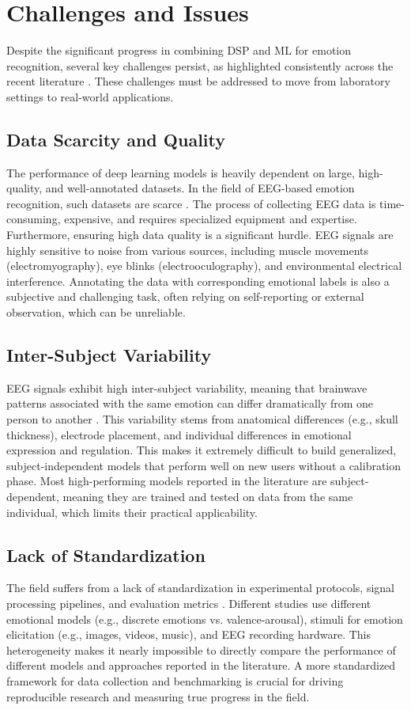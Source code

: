 \documentclass[conference]{IEEEtran}
\begin{document}
\section{Challenges and Issues}
Despite the significant progress in combining DSP and ML for emotion recognition, several key challenges persist, as highlighted consistently across the recent literature \cite{b6, b7, b8}. These challenges must be addressed to move from laboratory settings to real-world applications.

\subsection*{Data Scarcity and Quality}
The performance of deep learning models is heavily dependent on large, high-quality, and well-annotated datasets. In the field of EEG-based emotion recognition, such datasets are scarce \cite{b8}. The process of collecting EEG data is time-consuming, expensive, and requires specialized equipment and expertise. Furthermore, ensuring high data quality is a significant hurdle. EEG signals are highly sensitive to noise from various sources, including muscle movements (electromyography), eye blinks (electrooculography), and environmental electrical interference. Annotating the data with corresponding emotional labels is also a subjective and challenging task, often relying on self-reporting or external observation, which can be unreliable.

\subsection*{Inter-Subject Variability}
EEG signals exhibit high inter-subject variability, meaning that brainwave patterns associated with the same emotion can differ dramatically from one person to another \cite{b7}. This variability stems from anatomical differences (e.g., skull thickness), electrode placement, and individual differences in emotional expression and regulation. This makes it extremely difficult to build generalized, subject-independent models that perform well on new users without a calibration phase. Most high-performing models reported in the literature are subject-dependent, meaning they are trained and tested on data from the same individual, which limits their practical applicability.

\subsection*{Lack of Standardization}
The field suffers from a lack of standardization in experimental protocols, signal processing pipelines, and evaluation metrics \cite{b6}. Different studies use different emotional models (e.g., discrete emotions vs. valence-arousal), stimuli for emotion elicitation (e.g., images, videos, music), and EEG recording hardware. This heterogeneity makes it nearly impossible to directly compare the performance of different models and approaches reported in the literature. A more standardized framework for data collection and benchmarking is crucial for driving reproducible research and measuring true progress in the field.
\end{document}
